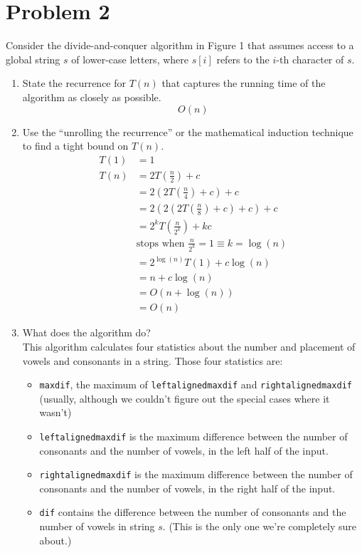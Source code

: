 \documentclass{math}
\begin{document}
\section*{Problem 2}
Consider the divide-and-conquer algorithm in Figure 1 that assumes access to
a global string \( s \) of lower-case letters, where \( s[i] \) refers to
the \( i \)-th character of \( s \).
\begin{enumerate}
  \item State the recurrence for \( T(n) \) that captures the running time of
  the algorithm as closely as possible.
  \[ O(n) \]
  \item Use the ``unrolling the recurrence'' or the mathematical induction
  technique to find a tight bound on \( T(n) \).
  \begin{align*}
    T(1) &= 1 \\
    T(n) &= 2T\left(\frac{n}{2}\right)+c \\
    &= 2\left(2T\left(\frac{n}{4}\right)+c\right)+c \\
    &= 2\left(2\left(2T\left(\frac{n}{8}\right)+c\right)+c\right)+c \\
    &= 2^kT\left(\frac{n}{2^k}\right)+kc \\
    & \text{stops when } \frac{n}{2^k} = 1 \equiv k = \log(n) \\
    &= 2^{\log(n)}T(1)+c\log(n) \\
    &= n+c\log(n) \\
    &= O(n+\log(n)) \\
    &= O(n)
  \end{align*}
  \item What does the algorithm do? \\
  This algorithm calculates four statistics about the number and placement of
  vowels and consonants in a string. Those four statistics are:
  \begin{itemize}
    \item \texttt{maxdif}, the maximum of \texttt{leftalignedmaxdif} and
    \texttt{rightalignedmaxdif} (usually, although we couldn't figure out the
    special cases where it wasn't)
    \item \texttt{leftalignedmaxdif} is the maximum difference between the
    number of consonants and the number of vowels, in the left half of the
    input.
    \item \texttt{rightalignedmaxdif} is the maximum difference between the
    number of consonants and the number of vowels, in the right half of the
    input.
    \item \texttt{dif} contains the difference between the number of consonants
    and the number of vowels in string \( s \). (This is the only one we're
    completely sure about.)
  \end{itemize}
\end{enumerate}
\end{document}
